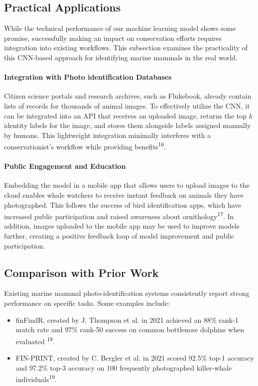 \documentclass[twocolumn]{article}
\begin{document}
\subsection{Practical Applications}

While the technical performance of our machine learning model shows some promise, successfully making an impact on conservation efforts requires integration into existing workflows. This subsection examines the practicality of this CNN-based approach for identifying marine mammals in the real world.

\paragraph{Integration with Photo identification Databases}

Citizen science portals and research archives, such as Flukebook, already contain lists of records for thousands of animal images. To effectively utilize the CNN, it can be integrated into an API that receives an uploaded image, returns the top $k$ identity labels for the image, and stores them alongside labels assigned manually by humans. This lightweight integration minimally interferes with a conservationist's workflow while providing benefits\textsuperscript{16}.

\paragraph{Public Engagement and Education}

Embedding the model in a mobile app that allows users to upload images to the cloud enables whale watchers to receive instant feedback on animals they have photographed. This follows the success of bird identification apps, which have increased public participation and raised awareness about ornithology\textsuperscript{17}.  In addition, images uploaded to the mobile app may be used to improve models further, creating a positive feedback loop of model improvement and public participation.

\subsection{Comparison with Prior Work}

Existing marine mammal photo-identification systems consistently report strong performance on specific tasks. Some examples include: 
\begin{itemize}
    \item finFindR, created by J. Thompson et al. in 2021 achieved an 88\% rank-1 match rate and 97\% rank-50 success on common bottlenose dolphins when evaluated \textsuperscript{18}.
    \item FIN-PRINT, created by C. Bergler et al. in 2021 scored 92.5\% top-1 accuracy and 97.2\% top-3 accuracy on 100 frequently photographed killer-whale individuals\textsuperscript{19}.
\end{itemize}
\end{document}
